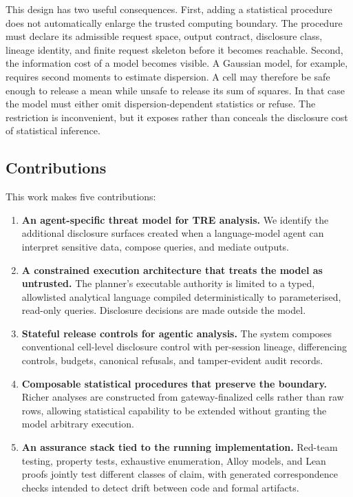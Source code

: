 \documentclass[11pt,a4paper]{article}
\begin{document}
This design has two useful consequences. First, adding a statistical procedure
does not automatically enlarge the trusted computing boundary. The procedure
must declare its admissible request space, output contract, disclosure class,
lineage identity, and finite request skeleton before it becomes reachable.
Second, the information cost of a model becomes visible. A Gaussian model, for
example, requires second moments to estimate dispersion. A cell may therefore
be safe enough to release a mean while unsafe to release its sum of squares. In
that case the model must either omit dispersion-dependent statistics or refuse.
The restriction is inconvenient, but it exposes rather than conceals the
disclosure cost of statistical inference.

\subsection{Contributions}
\label{sec:contributions}

This work makes five contributions:

\begin{enumerate}[leftmargin=*]
  \item \textbf{An agent-specific threat model for TRE analysis.} We identify
  the additional disclosure surfaces created when a language-model agent can
  interpret sensitive data, compose queries, and mediate outputs.

  \item \textbf{A constrained execution architecture that treats the model as
  untrusted.} The planner's executable authority is limited to a typed,
  allowlisted analytical language compiled deterministically to parameterised,
  read-only queries. Disclosure decisions are made outside the model.

  \item \textbf{Stateful release controls for agentic analysis.} The system
  composes conventional cell-level disclosure control with per-session lineage,
  differencing controls, budgets, canonical refusals, and tamper-evident audit
  records.

  \item \textbf{Composable statistical procedures that preserve the boundary.}
  Richer analyses are constructed from gateway-finalized cells rather than raw
  rows, allowing statistical capability to be extended without granting the
  model arbitrary execution.

  \item \textbf{An assurance stack tied to the running implementation.}
  Red-team testing, property tests, exhaustive enumeration, Alloy models, and
  Lean proofs jointly test different classes of claim, with generated
  correspondence checks intended to detect drift between code and formal
  artifacts.
\end{enumerate}
\end{document}
